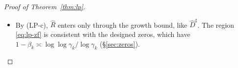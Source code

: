 \begin{proof}[Proof of Theorem~\ref{thm:lp}]
\begin{itemize}
  present scaling this binds. Assume
  \begin{equation}\label{eq:lp-yrange}
    \log y\ge10^4\Lambda^2\log\log y,\qquad\text{so that}\quad Q_y:=\frac{\log y}{\Lambda\log\log y}\ge10^4\Lambda ,
  \end{equation}
  and put $\log T_y:=Q_y/51-500$. For $|t|\le T_y+1$ we have $L_t\le\log(T_y+4)\le\log T_y+4/T_y$, where $T_y\ge e^{10^{10}}$ (as $\log T_y\ge10^4\Lambda/51-500$); so
  $X(t)\le Q_y$ and $Y(t)\le Q_y/51-57+2\log\Lambda+\log Q_y\le Q_y/50.35$, because
  $(1/50.35-1/51)Q_y\ge2.53\cdot10^{-4}Q_y\ge2\log\Lambda+\log Q_y$.
  Since $0.33769\cdot50.35\ge17.002$, this gives $\eta=0.33769/(\Lambda Y)\ge17/(\Lambda Q_y)=\eta_y$. So the zero-free region is
  \begin{equation}\label{eq:lp-zf}
    \sigma\ge1-\frac{c_{\mathrm{zf}}}{\log(|t|+3)+460+2\log\Lambda}\qquad\text{for }|t|\le T_y+1,\qquad
    \log T_y:=\frac{\log y}{51\Lambda\log\log y}-500 .
  \end{equation}
  Together with Step~6 this covers all $|t|\le T_y+1$. Every application below satisfies \eqref{eq:lp-yrange}.
\item By (LP-c), $\hat R$ enters only through the growth bound, like $\hat D^\sharp$. The region \eqref{eq:lp-zf} is
  consistent with the designed zeros, which have $1-\beta_k\asymp\log\log\gamma_k/\log\gamma_k$ (\S\ref{sec:zeros}).
\end{itemize}


\end{proof}

